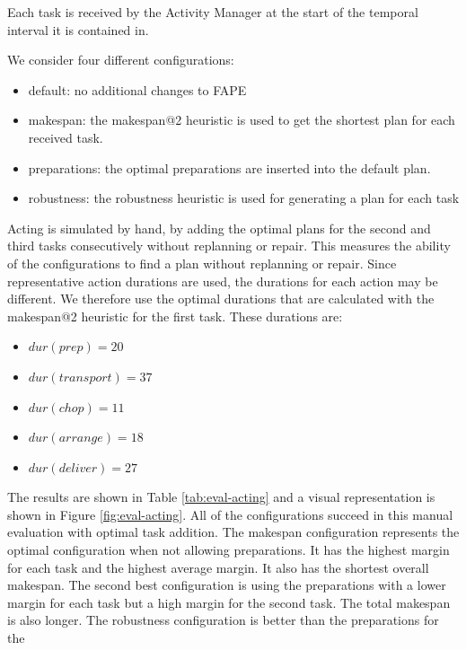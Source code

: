 Each task is received by the Activity Manager at the start of the temporal interval it is contained in.

We consider four different configurations:
\begin{itemize}
  \item default: no additional changes to FAPE
  \item makespan: the makespan@2 heuristic is used to get the shortest plan for each received task.
  \item preparations: the optimal preparations are inserted into the default plan.
  \item robustness: the robustness heuristic is used for generating a plan for each task
\end{itemize}

Acting is simulated by hand, by adding the optimal plans for the second and third tasks consecutively without replanning or repair.
This measures the ability of the configurations to find a plan without replanning or repair.
Since representative action durations are used, the durations for each action may be different.
We therefore use the optimal durations that are calculated with the makespan@2 heuristic for the first task.
These durations are: 
\begin{itemize}
  \item $dur(prep)=20$
  \item $dur(transport)=37$
  \item $dur(chop)=11$
  \item $dur(arrange)=18$
  \item $dur(deliver)=27$
\end{itemize}

The results are shown in Table \ref{tab:eval-acting} and a visual representation is shown in Figure \ref{fig:eval-acting}.
All of the configurations succeed in this manual evaluation with optimal task addition.
The makespan configuration represents the optimal configuration when not allowing preparations.
It has the highest margin for each task and the highest average margin.
It also has the shortest overall makespan.
The second best configuration is using the preparations with a lower margin for each task but a high margin for the second task.
The total makespan is also longer.
The robustness configuration is better than the preparations for the 

